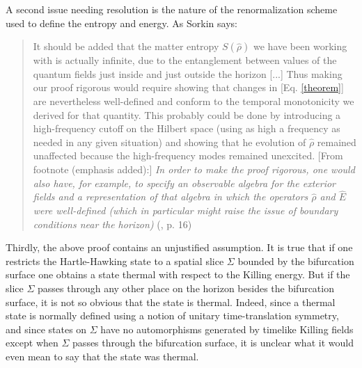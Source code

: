 \documentclass[12pt]{article}
\begin{document}
A second issue needing resolution is the nature of the renormalization scheme used to define the entropy and energy.  As Sorkin says: 
\begin{quote}\small
It should be added that the matter entropy $S(\hat{\rho})$ we have been working with is actually infinite, due to the entanglement between values of the quantum fields just inside and just outside the horizon [...] Thus making our proof rigorous would require showing that changes in [Eq. \ref{theorem}] are nevertheless well-defined and conform to the temporal monotonicity we derived for that quantity. This probably could be done by introducing a high-frequency cutoff on the Hilbert space (using as high a frequency as needed in any given situation) and showing that he evolution of $\hat{\rho}$ remained unaffected because the high-frequency modes remained unexcited.  [From footnote (emphasis added):] \emph{In order to make the proof rigorous, one would also have, for example, to specify an observable algebra for the exterior fields and a representation of that algebra in which the operators $\hat{\rho}$ and $\hat{E}$ were well-defined (which in particular might raise the issue of boundary conditions near the horizon)}  (\cite{sorkin98}, p. 16)
\end{quote}

Thirdly, the above proof contains an unjustified assumption.  It is true that if one restricts the Hartle-Hawking state to a spatial slice $\Sigma$ bounded by the bifurcation surface one obtains a state thermal with respect to the Killing energy.  But if the slice $\Sigma$ passes through any other place on the horizon besides the bifurcation surface, it is not so obvious that the state is thermal.  Indeed, since a thermal state is normally defined using a notion of unitary time-translation symmetry, and since states on $\Sigma$ have no automorphisms generated by timelike Killing fields except when $\Sigma$ passes through the bifurcation surface, it is unclear what it would even mean to say that the state was thermal.
\end{document}
